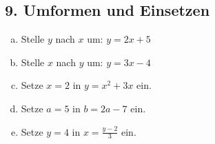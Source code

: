 \subsection*{9. Umformen und Einsetzen}
\begin{enumerate}[a)]
    \item Stelle $y$ nach $x$ um: $y = 2x + 5$
    \item Stelle $x$ nach $y$ um: $y = 3x - 4$
    \item Setze $x=2$ in $y = x^2 + 3x$ ein.
    \item Setze $a=5$ in $b = 2a - 7$ ein.
    \item Setze $y=4$ in $x = \frac{y-2}{3}$ ein.
\end{enumerate}


